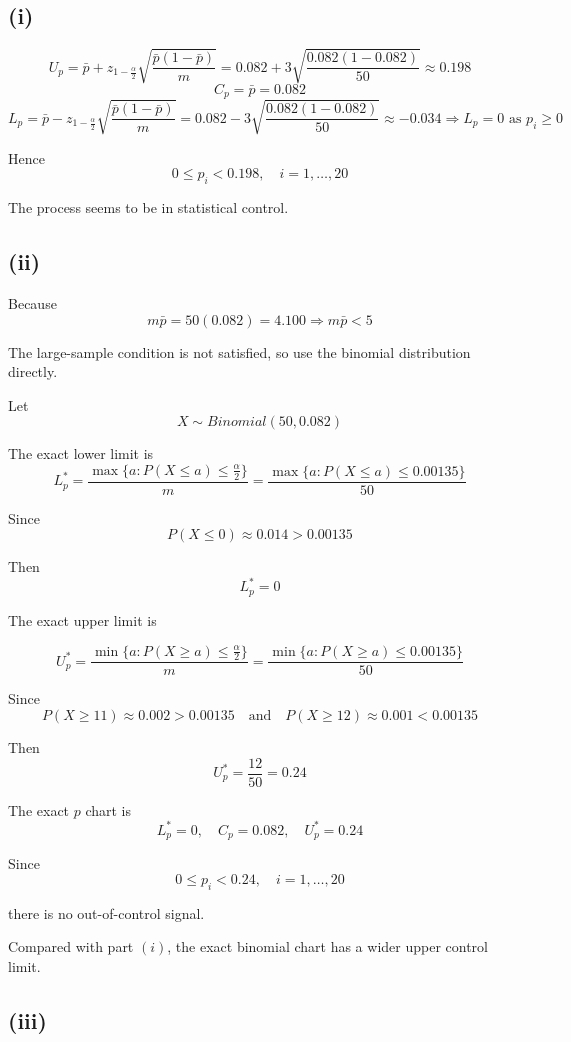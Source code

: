 \documentclass[a4paper, 12pt]{article}  %
\begin{document}
\subsection*{(i)}

$$
U_p=\bar p+z_{1-\frac{\alpha}{2}}\sqrt{\frac{\bar p(1-\bar p)}{m}}=0.082+3\sqrt{\frac{0.082(1-0.082)}{50}}\approx 0.198
$$
$$
C_p=\bar p=0.082
$$
$$
L_p=\bar p-z_{1-\frac{\alpha}{2}}\sqrt{\frac{\bar p(1-\bar p)}{m}}=0.082-3\sqrt{\frac{0.082(1-0.082)}{50}}\approx -0.034\Rightarrow L_p=0 \text{ as } p_i\ge 0
$$

Hence
$$
0\le p_i<0.198,\quad i=1,\ldots,20
$$

The process seems to be in statistical control.

\subsection*{(ii)}

Because
$$
m\bar p=50(0.082)=4.100\Rightarrow m\bar p<5
$$

The large-sample condition is not satisfied, so use the binomial distribution directly.

Let
$$
X\sim Binomial(50,0.082)
$$

The exact lower limit is
$$
L_p^*=\frac{\max\{a:P(X\le a)\le \frac{\alpha}{2}\}}{m}=\frac{\max\{a:P(X\le a)\le 0.00135\}}{50}
$$

Since
$$
P(X\le 0)\approx 0.014>0.00135
$$

Then
$$
L_p^*=0
$$

The exact upper limit is

$$
U_p^*=\frac{\min\{a:P(X\ge a)\le \frac{\alpha}{2}\}}{m}=\frac{\min\{a:P(X\ge a)\le 0.00135\}}{50}
$$

Since
$$
P(X\ge 11)\approx 0.002>0.00135
\quad\text{and}\quad
P(X\ge 12)\approx 0.001<0.00135
$$

Then
$$
U_p^*=\frac{12}{50}=0.24
$$

The exact \(p\) chart is
$$
L_p^*=0,\quad C_p=0.082,\quad U_p^*=0.24
$$

Since
$$
0\le p_i<0.24,\quad i=1,\ldots,20
$$

there is no out-of-control signal.

Compared with part \((i)\), 
the exact binomial chart has a wider upper control limit.

\subsection*{(iii)}
\end{document}
